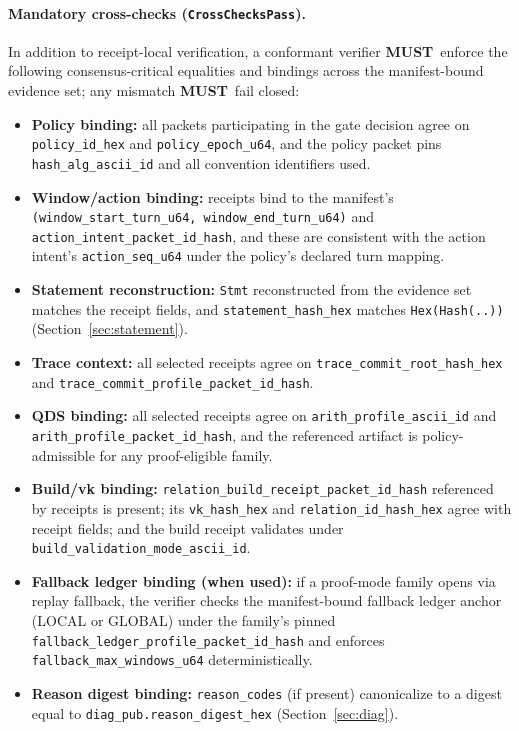 \documentclass[11pt]{article}
\newcommand{\MUST}{\textbf{MUST}}
\begin{document}
\paragraph{Mandatory cross-checks (\texttt{CrossChecksPass}).}
In addition to receipt-local verification, a conformant verifier \MUST\ enforce the following consensus-critical equalities and bindings across the manifest-bound evidence set; any mismatch \MUST\ fail closed:
\begin{itemize}[leftmargin=1.2em]
  \item \textbf{Policy binding:} all packets participating in the gate decision agree on \texttt{policy\_id\_hex} and \texttt{policy\_epoch\_u64}, and the policy packet pins \texttt{hash\_alg\_ascii\_id} and all convention identifiers used.
  \item \textbf{Window/action binding:} receipts bind to the manifest's \texttt{(window\_start\_turn\_u64, window\_end\_turn\_u64)} and \texttt{action\_intent\_packet\_id\_hash}, and these are consistent with the action intent's \texttt{action\_seq\_u64} under the policy's declared turn mapping.
  \item \textbf{Statement reconstruction:} \texttt{Stmt} reconstructed from the evidence set matches the receipt fields, and \texttt{statement\_hash\_hex} matches \texttt{Hex(Hash(..))} (Section~\ref{sec:statement}).
  \item \textbf{Trace context:} all selected receipts agree on \texttt{trace\_commit\_root\_hash\_hex} and \texttt{trace\_commit\_profile\_packet\_id\_hash}.
  \item \textbf{QDS binding:} all selected receipts agree on \texttt{arith\_profile\_ascii\_id} and \texttt{arith\_profile\_packet\_id\_hash}, and the referenced artifact is policy-admissible for any proof-eligible family.
  \item \textbf{Build/vk binding:} \texttt{relation\_build\_receipt\_packet\_id\_hash} referenced by receipts is present; its \texttt{vk\_hash\_hex} and \texttt{relation\_id\_hash\_hex} agree with receipt fields; and the build receipt validates under \texttt{build\_validation\_mode\_ascii\_id}.
  \item \textbf{Fallback ledger binding (when used):} if a proof-mode family opens via replay fallback, the verifier checks the manifest-bound fallback ledger anchor (LOCAL or GLOBAL) under the family's pinned \texttt{fallback\_ledger\_profile\_packet\_id\_hash} and enforces \texttt{fallback\_max\_windows\_u64} deterministically.
  \item \textbf{Reason digest binding:} \texttt{reason\_codes} (if present) canonicalize to a digest equal to \texttt{diag\_pub.reason\_digest\_hex} (Section~\ref{sec:diag}).
\end{itemize}
\end{document}
